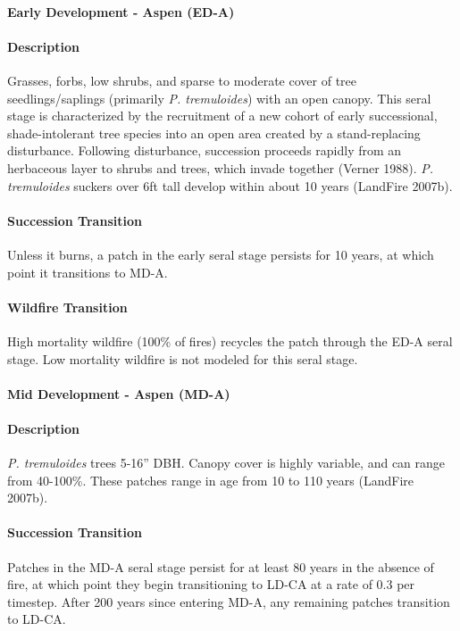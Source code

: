 \paragraph{Early Development - Aspen (ED-A)}

\paragraph{Description} Grasses, forbs, low shrubs, and sparse to moderate cover of tree seedlings/saplings (primarily \emph{P. tremuloides}) with an open canopy. This seral stage is characterized by the recruitment of a new cohort of early successional, shade-intolerant tree species into an open area created by a stand-replacing disturbance. Following disturbance, succession proceeds rapidly from an herbaceous layer to shrubs and trees, which invade together (Verner 1988). \emph{P. tremuloides} suckers over 6ft tall develop within about 10 years (LandFire 2007b). 


\paragraph{Succession Transition} Unless it burns, a patch in the early seral stage persists for 10 years, at which point it transitions to MD-A.

\paragraph{Wildfire Transition} High mortality wildfire (100\% of fires) recycles the patch through the ED-A seral stage. Low mortality wildfire is not modeled for this seral stage.

\noindent\hrulefill


\paragraph{Mid Development - Aspen (MD-A)}

\paragraph{Description} \emph{P. tremuloides} trees 5-16'' DBH. Canopy cover is highly variable, and can range from 40-100\%. These patches range in age from 10 to 110 years (LandFire 2007b).

\paragraph{Succession Transition} Patches in the MD-A seral stage persist for at least 80 years in the absence of fire, at which point they begin transitioning to LD-CA at a rate of 0.3 per timestep. After 200 years since entering MD-A, any remaining patches transition to LD-CA. 

